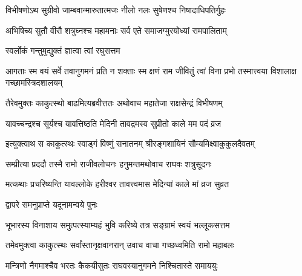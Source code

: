 \twolineshloka
{विभीषणोऽथ सुग्रीवो जाम्बवान्मारुतात्मजः}
{नीलो नलः सुषेणश्च निषादाधिपतिर्गुहः}%

\twolineshloka
{अभिषिच्य सुतौ वीरौ शत्रुघ्नश्च महामनाः}
{सर्व एते समाजग्मुरयोध्यां रामपालिताम्}%



\onelineshloka
{स्वर्लोकं गन्तुमुद्युक्तं ज्ञात्वा त्वां रघुसत्तम}%


\threelineshloka
{आगताः स्म वयं सर्वे तवानुगमनं प्रति}
{न शक्ताः स्म क्षणं राम जीवितुं त्वां विना प्रभो}
{तस्मात्त्वया विशालाक्ष गच्छामस्त्रिदशालयम्}%


\twolineshloka
{तैरेवमुक्तः काकुत्स्थो बाढमित्यब्रवीत्ततः}
{अथोवाच महातेजा राक्षसेन्द्रं विभीषणम्}%



\twolineshloka
{यावच्चन्द्रश्च सूर्यश्च यावत्तिष्ठति मेदिनी}
{तावद्रमस्व सुप्रीतो काले मम पदं व्रज}%


\twolineshloka
{इत्युक्त्वाथ स काकुत्स्थः स्वाड्गं विष्णुं सनातनम्}
{श्रीरङ्गशायिनं सौम्यमिक्ष्वाकुकुलदैवतम्}%

\twolineshloka
{सम्प्रीत्या प्रददौ तस्मै रामो राजीवलोचनः}
{हनुमन्तमथोवाच राघवः शत्रुसूदनः}%


\twolineshloka
{मत्कथाः प्रचरिष्यन्ति यावल्लोके हरीश्वर}
{तावत्त्वमास मेदिन्यां काले मां व्रज सुव्रत}%



\onelineshloka
{द्वापरे समनुप्राप्ते यदूनामन्वये पुनः}%

\twolineshloka
{भूभारस्य विनाशाय समुत्पत्स्याम्यहं भुवि}
{करिष्ये तत्र सङ्ग्रामं स्वयं भल्लूकसत्तम}%


\twolineshloka
{तमेवमुक्त्वा काकुत्स्थः सर्वांस्तानृक्षवानरान्}
{उवाच वाचा गच्छध्वमिति रामो महाबलः}%

\twolineshloka
{मन्त्रिणो नैगमाश्चैव भरतः कैकयीसुतः}
{राघवस्यानुगमने निश्चितास्ते समाययुः}%

